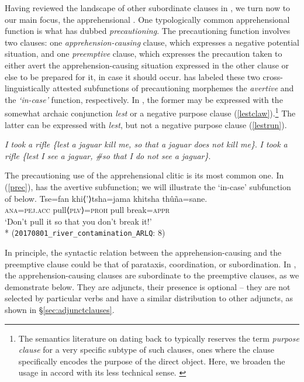 \documentclass[output=paper,colorlinks,citecolor=brown]{langscibook}
\begin{document}
Having reviewed the landscape of other subordinate clauses in , we turn now to our main focus, the apprehensional \sane. One typologically common apprehensional function is what \citet{lichtenberk1995apprehensional} has dubbed  \textit{precautioning}. The precautioning function involves two clauses: one \emph{apprehension-causing} clause, which expresses a negative potential situation, and one \emph{preemptive} clause, which expresses the precaution taken to either avert the apprehension-causing situation expressed in the other clause or else to be prepared for it, in case it should occur. \citet{lichtenberk1995apprehensional} has labeled these two cross-linguistically attested subfunctions of precautioning morphemes the \emph{avertive} and the \emph{`in-case'} function, respectively. In , the former may be expressed with the somewhat archaic conjunction \emph{lest} or a negative purpose clause (\ref{lestclaw}).\footnote{The semantics literature on  dating back to \citet{faraci1974aspects} typically reserves the term \textit{purpose clause} for a very specific subtype of such clauses, ones where the clause specifically encodes the purpose of the direct object. Here, we broaden the usage in accord with its less technical sense. \label{fn:repeat}} The latter can be expressed with \emph{lest}, but not a negative purpose clause (\ref{lestrun}).
\begin{exe}
    \ex \label{lestclaw}
    \glt \textit{I took a rifle \textup{\{}lest a jaguar kill me, so that a jaguar does not kill me\textup{\}}}.
    \ex \label{lestrun}
    \glt \textit{I took a rifle \textup{\{}lest I see a jaguar, \#so that I do not see a jaguar\textup{\}}}.
\end{exe}

The precautioning use of the apprehensional clitic  is its most common one. In (\ref{prec}),  has the avertive subfunction; we will illustrate the `in-case' subfunction of  below.
    \ea \label{prec} %
    \gll Tse=fan         khi⟨'⟩tsha=jama   {\ob}khitsha thûña=sane.{\cb}  \\
         \textsc{ana=pej.acc} pull⟨\textsc{plv}⟩=\textsc{proh} pull         break\textsc{=appr}   \\
    \glt `Don't pull it so that you don't break it!' \\*
    \hfill (\texttt{20170801\_river\_contamination\_ARLQ}: {\textsc{8}})
    \z

In principle, the syntactic relation between the apprehension-causing and the preemptive clause could be that of parataxis, coordination, or subordination. In , the apprehension-causing  clauses are subordinate to the preemptive clauses, as we demonstrate below. They are adjuncts, their presence is optional -- they are not selected by particular verbs and have a similar distribution to other adjuncts, as shown in \S\ref{sec:adjunctclauses}.
\end{document}
